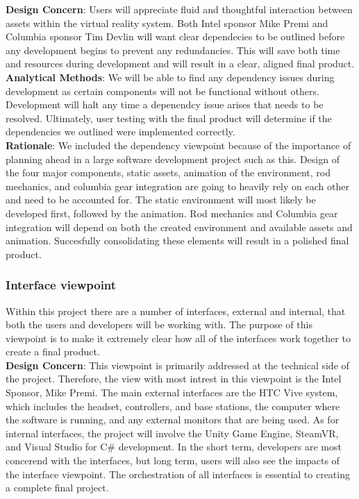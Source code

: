 \documentclass[10pt,journal,compsoc,onecolumn, draftclsnofoot]{IEEEtran}
\begin{document}
\hangindent=0.5cm \textbf{Design Concern}: Users will appreciate fluid and thoughtful interaction between assets within the virtual reality system. Both Intel sponsor Mike Premi and Columbia sponsor Tim Devlin will want clear dependecies to be outlined before any development begins to prevent any redundancies. This will save both time and resources during development and will result in a clear, aligned final product.\\

\hangindent=0.5cm \textbf{Analytical Methods}: We will be able to find any dependency issues during development as certain components will not be functional without others. Development will halt any time a depenendcy issue arises that needs to be resolved. Ultimately, user testing with the final product will determine if the dependencies we outlined were implemented correctly.\\

\hangindent=0.5cm \textbf{Rationale}: We included the dependency viewpoint because of the importance of planning ahead in a large software development project such as this. Design of the four major components, static assets, animation of the environment, rod mechanics, and columbia gear integration are going to heavily rely on each other and need to be accounted for. The static environment will most likely be developed first, followed by the animation. Rod mechanics and Columbia gear integration will depend on both the created environment and available assets and animation. Succesfully consolidating these elements will result in a polished final product.\\

\subsubsection{Interface viewpoint}
Within this project there are a number of interfaces, external and internal, that both the users and developers will be working with.
The purpose of this viewpoint is to make it extremely clear how all of the interfaces work together to create a final product. \\

\hangindent=0.5cm \textbf{Design Concern}: This viewpoint is primarily addressed at the technical side of the project.
Therefore, the view with most intrest in this viewpoint is the Intel Sponsor, Mike Premi.
The main external interfaces are the HTC Vive system, which includes the headset, controllers, and base stations, the computer where the software is running, and any external monitors that are being used.
As for internal interfaces, the project will involve the Unity Game Engine, SteamVR, and Visual Studio for C\# development.
In the short term, developers are most concerend with the interfaces, but long term, users will also see the impacts of the interface viewpoint.
The orchestration of all interfaces is essential to creating a complete final project. \\
\end{document}
